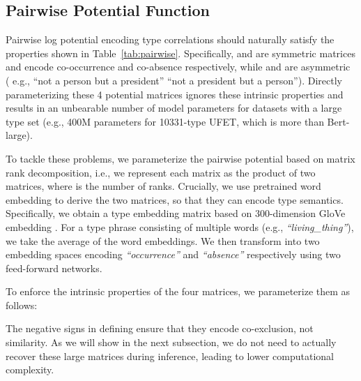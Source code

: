 \documentclass[11pt]{article}
\begin{document}
\subsection{Pairwise Potential Function}
\label{sec:pairwise}
\begin{table}[t]
\renewcommand\arraystretch{1.15}
\centering
{}
\caption{Properties of the four log potential matrices.}
\label{tab:pairwise}
\end{table}

Pairwise log potential  encoding type correlations should naturally satisfy the properties shown in Table~\ref{tab:pairwise}.
Specifically,  and  are symmetric matrices and encode co-occurrence and co-absence respectively, while  and are asymmetric ( e.g., ``not a person but a president''  ``not a president but a person''). Directly parameterizing these 4 potential matrices \cite{pcrf2005,pcrfT} ignores these intrinsic properties and results in an unbearable number of model parameters for datasets with a large type set (e.g., 400M parameters for 10331-type UFET, which is more than Bert-large).

To tackle these problems, we parameterize the pairwise potential based on matrix rank decomposition, i.e., we represent each  matrix as the product of two  matrices, where  is the number of ranks.
Crucially, we use pretrained word embedding to derive the two  matrices, so that they can encode type semantics.
Specifically, we obtain a type embedding matrix  based on 300-dimension GloVe embedding \cite{glove}. For a type phrase consisting of multiple words (e.g., \emph{``living\_thing''}), we take the average of the word embeddings. We then transform  into two embedding spaces encoding \emph{``occurrence''} and \emph{``absence''} respectively using two feed-forward networks.


To enforce the intrinsic properties of the four matrices, we parameterize them as follows:

The negative signs in defining  ensure that they encode co-exclusion, not similarity. As we will show in the next subsection, we do not need to actually recover these large matrices during inference, leading to lower computational complexity.
\end{document}
